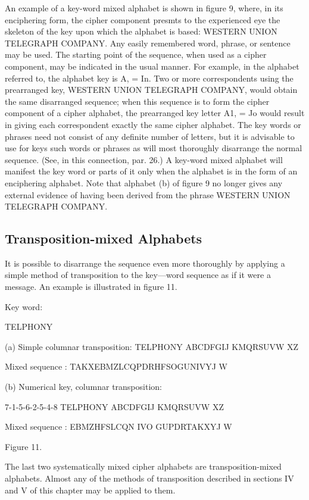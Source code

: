 \mypara An example of a key-word mixed alphabet is shown in ﬁgure 9,
where, in its enciphering form, the cipher component presmts to the
experienced eye the skeleton of the key upon which the alphabet is
based: WESTERN UNION TELEGRAPH COMPANY. Any easily
remembered word, phrase, or sentence may be used. The starting point
of the sequence, when used as a cipher component, may be indicated
in the usual manner. For example, in the alphabet referred to, the
alphabet key is A, = In. Two or more correspondents using the prearranged key, WESTERN UNION TELEGRAPH COMPANY,
would obtain the same disarranged sequence; when this sequence is to
form the cipher component of a cipher alphabet, the prearranged key
letter A1, = Jo would result in giving each correspondent exactly the
same cipher alphabet. The key words or phrases need not consist of any
deﬁnite number of letters, but it is advisable to use for keys such words
or phrases as will most thoroughly disarrange the normal sequence. (See,
in this connection, par. 26.) A key-word mixed alphabet will manifest
the key word or parts of it only when the alphabet is in the form of
an enciphering alphabet. Note that alphabet (b) of ﬁgure 9 no longer
gives any external evidence of having been derived from the phrase
WESTERN UNION TELEGRAPH COMPANY.

\subsection{Transposition-mixed Alphabets}

\mypara It is possible to disarrange the sequence even more thoroughly by
applying a simple method of transposition to the key—word sequence
as if it were a message. An example is illustrated in ﬁgure 11.

Key word:

TELPHONY

(a) Simple columnar transposition:
TELPHONY
ABCDFGIJ
KMQRSUVW
XZ

Mixed sequence :
TAKXEBMZLCQPDRHFSOGUNIVYJ W

(b) Numerical key, columnar transposition:

7-1-5-6-2-5-4-8
TELPHONY
ABCDFGIJ
KMQRSUVW
XZ

Mixed sequence :
EBMZHFSLCQN IVO GUPDRTAKXYJ W

Figure 11.

\mypara The last two systematically mixed cipher alphabets are transposition-mixed alphabets. Almost any of the methods of transposition
described in sections IV and V of this chapter may be applied to them.


